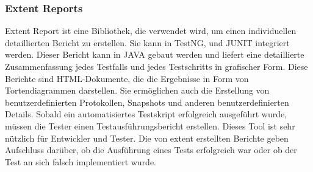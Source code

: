 \subsubsection{Extent Reports}\label{subsubsec:extent}

Extent Report ist eine Bibliothek, die verwendet wird, um einen individuellen
detaillierten Bericht zu erstellen. Sie kann in TestNG, und JUNIT integriert
werden. Dieser Bericht kann in JAVA gebaut werden und liefert eine
detaillierte Zusammenfassung jedes Testfalls und jedes Testschritts in
grafischer Form. Diese Berichte sind HTML-Dokumente, die die Ergebnisse
in Form von Tortendiagrammen darstellen. Sie ermöglichen auch die Erstellung
von benutzerdefinierten Protokollen, Snapshots und anderen benutzerdefinierten
Details. Sobald ein automatisiertes Testskript erfolgreich ausgeführt wurde,
müssen die Tester einen Testausführungsbericht erstellen. Dieses Tool ist
sehr nützlich für Entwickler und Tester. Die von extent erstellten Berichte
geben Aufschluss darüber, ob die Ausführung eines Tests erfolgreich war oder
ob der Test an sich falsch implementiert wurde.
